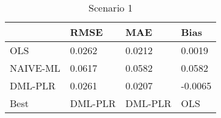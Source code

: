 \begin{table}[H]
\centering
\caption{Scenario 1}
\label{Scenario1}
\begin{tabular}{L{3.3333333333333335cm}L{2.6666666666666665cm}R{2.0cm}R{2.6666666666666665cm}}
\toprule
{} &     RMSE &      MAE &    Bias \\
\midrule
OLS      &   0.0262 &   0.0212 &  0.0019 \\
NAIVE-ML &   0.0617 &   0.0582 &  0.0582 \\
DML-PLR  &   0.0261 &   0.0207 & -0.0065 \\
Best     &  DML-PLR &  DML-PLR &     OLS \\
\bottomrule
\end{tabular}
\end{table}
